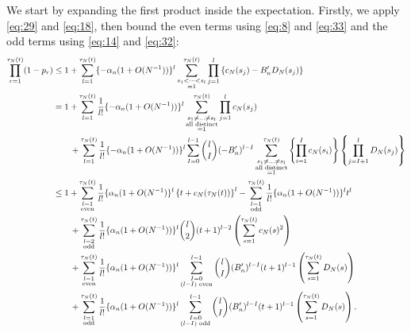 \documentclass{article}
\newcommand{\1}[1]{\mathbbm{1}_{#1}}
\begin{document}
We start by expanding the first product inside the expectation.
Firstly, we apply \eqref{eq:29} and \eqref{eq:18}, then bound the even terms using \eqref{eq:8} and \eqref{eq:33} and the odd terms using \eqref{eq:14} and \eqref{eq:32}:
\begin{align}
\prod_{r=1}^{\tau_N(t)} (1-p_r)
&\leq 1 + \sum_{l=1}^{\tau_N(t)} \{-\alpha_n (1+ O(N^{-1}))\}^l
\sum_{\substack{s_1<\dots<s_l \\ =1}}^{\tau_N(t)} \prod_{j=1}^l
\left\{ c_N(s_j) - B_n^\prime D_N(s_j) \right\} \notag\\
&= 1 + \sum_{l=1}^{\tau_N(t)} \frac{1}{l!} \{-\alpha_n (1+O(N^{-1}))\}^l
\sum_{\substack{s_1\neq\dots\neq s_l \\ \text{all distinct} \\ =1}}^{\tau_N(t)} \prod_{j=1}^l c_N(s_j) \notag\\
&\qquad+ \sum_{l=1}^{\tau_N(t)} \frac{1}{l!} \{-\alpha_n (1+O(N^{-1}))\}^l
\sum_{I=0}^{l-1} \binom{l}{I} (-B_n^\prime)^{l-I}
\sum_{\substack{s_1\neq\dots\neq s_l \\ \text{all distinct} \\ =1}}^{\tau_N(t)}
\left\{ \prod_{i=1}^I c_N(s_i) \right\}
\left\{ \prod_{j=I+1}^l D_N(s_j) \right\} \notag\\
&\leq 1 + \sum_{\substack{l=1\\\text{even}}}^{\tau_N(t)} \frac{1}{l!} \{\alpha_n(1+O(N^{-1})\}^l \left\{ t + c_N(\tau_N(t)) \right\}^l
- \sum_{\substack{l=1\\\text{odd}}}^{\tau_N(t)} \frac{1}{l!} \{\alpha_n (1+O(N^{-1}))\}^l t^l \notag\\
&\qquad+ \sum_{\substack{l=2\\\text{odd}}}^{\tau_N(t)} \frac{1}{l!} \{\alpha_n (1+O(N^{-1}))\}^l \binom{l}{2} (t+1)^{l-2} 
\left( \sum_{s=1}^{\tau_N(t)} c_N(s)^2 \right) \notag\\
&\qquad+ \sum_{\substack{l=1\\ \text{even}}}^{\tau_N(t)} \frac{1}{l!} \{\alpha_n(1+O(N^{-1}))\}^l 
\sum_{\substack{I=0\\ (l-I)\text{ even} }}^{l-1} \binom{l}{I} (B_n^\prime)^{l-I} (t+1)^{l-1}
\left( \sum_{s=1}^{\tau_N(t)} D_N(s) \right) \notag\\
&\qquad+ \sum_{\substack{l=1\\ \text{odd}}}^{\tau_N(t)} \frac{1}{l!} \{\alpha_n(1+O(N^{-1}))\}^l
\sum_{\substack{I=0\\ (l-I)\text{ odd}}}^{l-1} \binom{l}{I} (B_n^\prime)^{l-I} (t+1)^{l-1}
\left( \sum_{s=1}^{\tau_N(t)} D_N(s) \right) .\label{eq:51}
\end{align}
\end{document}
